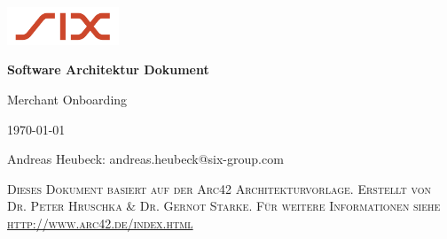 \graphicspath{{./images/}}

\begin{titlepage}
	\raggedleft
	\includegraphics[width=0.25\textwidth]{sixlogo.png}\par\vspace{1cm}
	\raggedright
	\vspace{2cm}
	{\huge\bfseries Software Architektur Dokument\par}
	\vspace{1cm}
	{\huge Merchant Onboarding\par}
	\vspace{1cm}
	{\large \today\par}
	\vspace{0.5cm}
	{\large Andreas Heubeck: andreas.heubeck@six-group.com\par}
	\vfill
	\vspace{8cm}
	\textsc{Dieses Dokument basiert auf der Arc42 Architekturvorlage. Erstellt von Dr. Peter Hruschka \& Dr. Gernot Starke. Für weitere Informationen siehe \url{http://www.arc42.de/index.html}}\par
	\vfill
\end{titlepage}